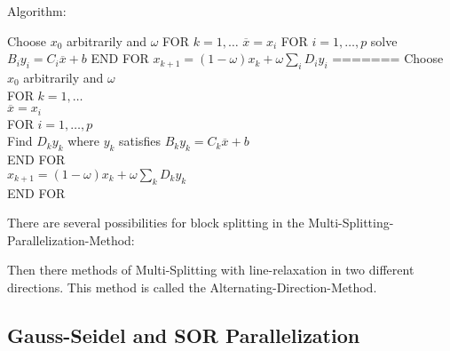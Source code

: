 Algorithm:

Choose $x_0$ arbitrarily and $\omega $
FOR $k=1,\ldots $
	$\overline{x} = x_{i}$
	FOR $i=1, \ldots, p$
		solve $B_{i}y_{i} = C_{i}\overline{x} + b$
	END FOR
	$x_{k+1} = (1-\omega ) x_{k} + \omega \sum_{i}^{}{D_{i}y_{i}}$
=======
Choose $x_0$ arbitrarily and $\omega $\\
FOR $k=1,\ldots $ \\
\tab	$\overline{x} = x_{i}$\\
\tab	FOR $i=1, \ldots, p$\\
\tab	Find $D_{k}y_{k}$ where $y_{k}$ satisfies $B_{k}y_{k} = C_{k}\overline{x}+b$\\
\tab	END FOR\\
\tab	$x_{k+1} = (1-\omega ) x_{k} + \omega \sum_{k}^{}{D_{k}y_{k}}$\\
END FOR


There are several possibilities for block splitting in the Multi-Splitting-Parallelization-Method:


Then there methods of Multi-Splitting with line-relaxation in two different directions. This method is called the Alternating-Direction-Method.

\subsection*{Gauss-Seidel and SOR Parallelization}
\label{sec:Gauss-Seidel and SOR Parallelization}

